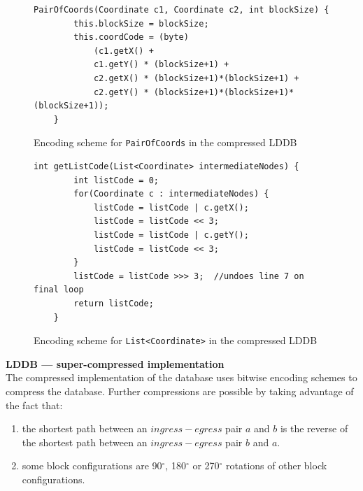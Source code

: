 \documentclass[12pt,notitlepage]{report}
\begin{document}
\begin{figure}
\begin{lstlisting}
PairOfCoords(Coordinate c1, Coordinate c2, int blockSize) {
		this.blockSize = blockSize;
		this.coordCode = (byte) 
			(c1.getX() + 
			c1.getY() * (blockSize+1) + 
			c2.getX() * (blockSize+1)*(blockSize+1) + 
			c2.getY() * (blockSize+1)*(blockSize+1)*(blockSize+1));
	}
\end{lstlisting}
\caption{Encoding scheme for {\tt PairOfCoords} in the compressed LDDB}
\end{figure}

\begin{figure}
\begin{lstlisting}
int getListCode(List<Coordinate> intermediateNodes) {
		int listCode = 0;
		for(Coordinate c : intermediateNodes) {
			listCode = listCode | c.getX();
			listCode = listCode << 3;
			listCode = listCode | c.getY();
			listCode = listCode << 3;
		}
		listCode = listCode >>> 3;	//undoes line 7 on final loop
		return listCode;
	}
\end{lstlisting}
\caption{Encoding scheme for {\tt List<Coordinate>} in the compressed LDDB}
\end{figure}

\noindent
{\bfseries LDDB --- super-compressed implementation}\\
\noindent
The compressed implementation of the database uses bitwise encoding schemes to compress the database. Further compressions are possible by taking advantage of the fact that:
\begin{enumerate}
\item the shortest path between an $ingress-egress$ pair $a$ and $b$ is the reverse of the shortest path between an $ingress-egress$ pair $b$ and $a$. 
\item some block configurations are 90$^{\circ}$,  180$^{\circ}$ or 270$^{\circ}$ rotations of other block configurations.
\end{enumerate}
\end{document}
